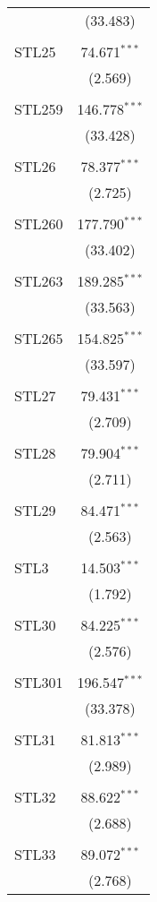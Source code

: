 \begin{table}[!htbp]
\begin{tabular}{@{\extracolsep{5pt}}lc}
  & (33.483) \\ 
  & \\ 
 STL25 & 74.671$^{***}$ \\ 
  & (2.569) \\ 
  & \\ 
 STL259 & 146.778$^{***}$ \\ 
  & (33.428) \\ 
  & \\ 
 STL26 & 78.377$^{***}$ \\ 
  & (2.725) \\ 
  & \\ 
 STL260 & 177.790$^{***}$ \\ 
  & (33.402) \\ 
  & \\ 
 STL263 & 189.285$^{***}$ \\ 
  & (33.563) \\ 
  & \\ 
 STL265 & 154.825$^{***}$ \\ 
  & (33.597) \\ 
  & \\ 
 STL27 & 79.431$^{***}$ \\ 
  & (2.709) \\ 
  & \\ 
 STL28 & 79.904$^{***}$ \\ 
  & (2.711) \\ 
  & \\ 
 STL29 & 84.471$^{***}$ \\ 
  & (2.563) \\ 
  & \\ 
 STL3 & 14.503$^{***}$ \\ 
  & (1.792) \\ 
  & \\ 
 STL30 & 84.225$^{***}$ \\ 
  & (2.576) \\ 
  & \\ 
 STL301 & 196.547$^{***}$ \\ 
  & (33.378) \\ 
  & \\ 
 STL31 & 81.813$^{***}$ \\ 
  & (2.989) \\ 
  & \\ 
 STL32 & 88.622$^{***}$ \\ 
  & (2.688) \\ 
  & \\ 
 STL33 & 89.072$^{***}$ \\ 
  & (2.768) \\ 

\end{tabular}
\end{table}
